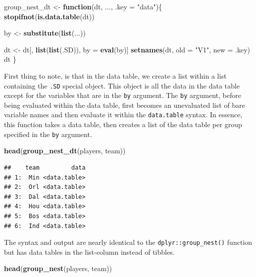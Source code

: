 \documentclass[doc,floatsintext]{apa6}
\newenvironment{Shaded}{\begin{snugshade}}{\end{snugshade}}
\newcommand{\ControlFlowTok}[1]{\textcolor[rgb]{0.13,0.29,0.53}{\textbf{#1}}}
\newcommand{\DataTypeTok}[1]{\textcolor[rgb]{0.13,0.29,0.53}{#1}}
\newcommand{\KeywordTok}[1]{\textcolor[rgb]{0.13,0.29,0.53}{\textbf{#1}}}
\newcommand{\NormalTok}[1]{#1}
\newcommand{\StringTok}[1]{\textcolor[rgb]{0.31,0.60,0.02}{#1}}
\begin{document}
\begin{Shaded}
\begin{Highlighting}[]
\NormalTok{group_nest_dt <-}\StringTok{ }\ControlFlowTok{function}\NormalTok{(dt, ..., }\DataTypeTok{.key =} \StringTok{"data"}\NormalTok{)\{}
  \KeywordTok{stopifnot}\NormalTok{(}\KeywordTok{is.data.table}\NormalTok{(dt))}

\NormalTok{  by <-}\StringTok{ }\KeywordTok{substitute}\NormalTok{(}\KeywordTok{list}\NormalTok{(...))}
  
\NormalTok{  dt <-}\StringTok{ }\NormalTok{dt[, }\KeywordTok{list}\NormalTok{(}\KeywordTok{list}\NormalTok{(.SD)), by =}\StringTok{ }\KeywordTok{eval}\NormalTok{(by)]}
  \KeywordTok{setnames}\NormalTok{(dt, }\DataTypeTok{old =} \StringTok{"V1"}\NormalTok{, }\DataTypeTok{new =}\NormalTok{ .key)}
\NormalTok{  dt}
\NormalTok{\}}
\end{Highlighting}
\end{Shaded}

First thing to note, is that in the data table, we create a list within a list containing the \texttt{.SD} special object. This object is all the data in the data table except for the variables that are in the \texttt{by} argument. The \texttt{by} argument, before being evaluated within the data table, first becomes an unevaluated list of bare variable names and then evaluate it within the \texttt{data.table} syntax. In essence, this function takes a data table, then creates a list of the data table per group specified in the \texttt{by} argument.

\begin{Shaded}
\begin{Highlighting}[]
\KeywordTok{head}\NormalTok{(}\KeywordTok{group_nest_dt}\NormalTok{(players, team))}
\end{Highlighting}
\end{Shaded}

\begin{verbatim}
##    team         data
## 1:  Min <data.table>
## 2:  Orl <data.table>
## 3:  Dal <data.table>
## 4:  Hou <data.table>
## 5:  Bos <data.table>
## 6:  Ind <data.table>
\end{verbatim}

The syntax and output are nearly identical to the \texttt{dplyr::group\_nest()} function but has data tables in the list-column instead of tibbles.

\begin{Shaded}
\begin{Highlighting}[]
\KeywordTok{head}\NormalTok{(}\KeywordTok{group_nest}\NormalTok{(players, team))}
\end{Highlighting}
\end{Shaded}
\end{document}
